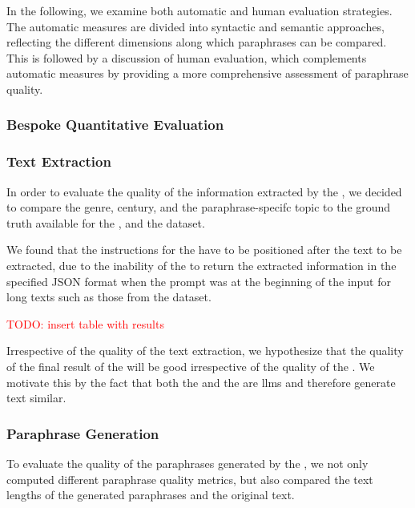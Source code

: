In the following, we examine both automatic and human evaluation strategies. 
The automatic measures are divided into syntactic and semantic approaches, reflecting the different dimensions along which paraphrases can be compared. 
This is followed by a discussion of human evaluation, which complements automatic measures by providing a more comprehensive assessment of paraphrase quality.




\subsubsection{Bespoke Quantitative Evaluation}
\label{subsec:custom_quantitative_evaluation}

\subsubsection{Text Extraction}
\label{subsec:text_extraction}

In order to evaluate the quality of the information extracted by the \pextractor{}, 
we decided to compare the genre, century, and the paraphrase-specifc topic to the 
ground truth available for the \dataBlog{}, \dataGutenberg{} and the \dataCustom{} dataset.

We found that the instructions for the \pextractor{} have to be positioned after the text to be extracted, 
due to the inability of the \pextractor{} to return the extracted information in the specified JSON format 
when the prompt was at the beginning of the input for long texts such as those from the \dataGutenberg{} dataset.

\textcolor{red}{TODO: insert table with results}

Irrespective of the quality of the text extraction, we hypothesize that the quality of the final result of the \pgenerator{} will be good irrespective of the quality of the \pextractor{}.
We motivate this by the fact that both the \pextractor{} and the \pgenerator{} are \acp{llm} and therefore generate text similar.

\subsubsection{Paraphrase Generation}
\label{subsec:paraphrase_generation}
To evaluate the quality of the paraphrases generated by the \pgenerator{}, 
we not only computed different paraphrase quality metrics, 
but also compared the text lengths of the generated paraphrases and the original text.

